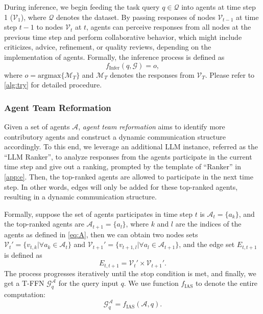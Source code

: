 \documentclass{article} %
\begin{document}
During inference, we begin feeding the task query $q\in\mathcal{Q}$ into agents at time step 1 ($\mathcal{V}_1$), where $\mathcal{Q}$ denotes the dataset. By passing responses of nodes $\mathcal{V}_{t-1}$ at time step $t-1$ to nodes $\mathcal{V}_{t}$ at $t$, agents can perceive responses from all nodes at the previous time step and perform collaborative behavior, which might include criticizes, advice, refinement, or quality reviews, depending on the implementation of agents. Formally, the inference process is defined as 
\begin{equation}
f_{\mathrm{Infer}}(q, \mathcal{G}) = o,
\end{equation}
where $o = \mathrm{argmax}\{\mathcal{M}_T\}$ and $\mathcal{M}_T$ denotes the responses from $\mathcal{V}_T$. 
Please refer to \cref{alg:try} for detailed procedure. 

\subsubsection{Agent Team Reformation}\label{sec:inference-proc}

Given a set of agents $\mathcal{A}$, \textit{agent team reformation} aims to identify more contributory agents and construct a dynamic communication structure accordingly. To this end, we leverage an additional LLM instance, referred as the ``LLM Ranker'', to analyze responses from the agents participate in the current time step and give out a ranking, prompted by the template of ``Ranker'' in \cref{app:e}. Then, the top-ranked agents are allowed to participate in the next time step. In other words, edges will only be added for these top-ranked agents, resulting in a dynamic communication structure.

Formally, suppose the set of agents participates in time step $t$ is $\mathcal{A}_t=\{a_k\}$, and the top-ranked agents are $\mathcal{A}_{t+1}=\{a_l\}$, where $k$ and $l$ are the indices of the agents as defined in \cref{eq:A}, then we can obtain two nodes sets $\mathcal{V}_t'=\{v_{t,k}|\forall a_k\in \mathcal{A}_t\}$ and $\mathcal{V}_{t+1}'=\{v_{t+1,l}|\forall a_l\in \mathcal{A}_{t+1}\}$, and the edge set $E_{t,t+1}$ is defined as
\begin{equation}
    E_{t,t+1} = \mathcal{V}_t' \times \mathcal{V}_{t+1}'.
\end{equation}
The process progresses iteratively until the stop condition is met, and finally, we get a T-FFN $\mathcal{G}_q^\mathcal{A}$ for the query input $q$. We use function $f_{\mathrm{IAS}}$ to denote the entire computation:
\begin{equation}
    \mathcal{G}_q^\mathcal{A}=f_{\mathrm{IAS}}(\mathcal{A}, q).
\end{equation}
\end{document}
